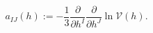 \begin{equation}\label{aij}
a_{IJ}(h):=-\frac{1}{3}\frac{\partial}{\partial h^{I}}
\frac{\partial}{\partial h^{J}} \ln \mathcal{V}(h).
\end{equation}

